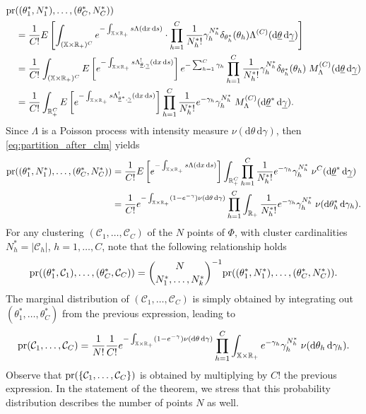 \documentclass[11pt,a4paper,oneside]{article}
\newcommand{\calC}{\mathcal{C}}
\newcommand{\dd}{\mathrm d}
\newcommand{\E}{E}
\newcommand{\X}{\mathbb{X}}
\newcommand{\R}{\mathbb{R}}
\newcommand{\prob}{{\rm pr}}
\theoremstyle{definition}
\theoremstyle{remark}
\begin{document}
\begin{align}
   & \prob((\theta^*_1,N^*_1),\ldots,(\theta^*_C,N^*_C)) \notag \\
    &\quad= \frac{1}{C!}\E\left[ \int_{(\X\times\R_+)^C}  e^{-\int_{\X\times\R_+} s \Lambda(\dd x\, \dd s)} \cdot \prod_{h=1}^C \frac{1}{{N^*_h}!}  \gamma_h^{N^*_h} \delta_{\theta^*_h}(\theta_h)   \Lambda^{(C)} (\dd\underline{\theta}\, \dd \underline{\gamma}) \right] \notag \\
    &\quad= \frac{1}{C!} \int_{(\X\times\R_+)^C} \E\left[ e^{-\int_{\X\times\R_+} s \Lambda^!_{\underline{\theta}, \underline{\gamma}}(\dd x \, \dd s)} \right] e^{-\sum_{h=1}^C \gamma_h} \prod_{h=1}^C \frac{1}{{N^*_h}!}  \gamma_h^{N^*_h} \delta_{\theta^*_h}(\theta_h) \;   M_\Lambda^{(C)} (\dd\underline{\theta}\, \dd \underline{\gamma}) \notag  \\
    &\quad= \frac{1}{C!} \int_{\R_+^C} \E\left[ e^{-\int_{\X\times\R_+} s \Lambda^!_{\underline{\theta}^*, \underline{\gamma}}(\dd x \, \dd s)} \right]  \prod_{h=1}^C \frac{1}{{N^*_h}!}  e^{-\gamma_h} \gamma_h^{N^*_h}   \; M_\Lambda^{(C)} (\dd\underline{\theta}^* \,\dd \underline{\gamma}). \label{eq:partition_after_clm}
\end{align}
Since $\Lambda$ is a Poisson process with intensity measure $\nu(\dd\theta\, \dd\gamma)$, then \eqref{eq:partition_after_clm} yields
\begin{equation*}
\begin{aligned}
    \prob((\theta^*_1,N^*_1),\ldots,(\theta^*_C,N^*_C))&= \frac{1}{C!}\E\left[ e^{-\int_{\X\times\R_+} s \Lambda(\dd x\, \dd s)} \right]  \int_{\R_+^C}  \prod_{h=1}^C \frac{1}{{N^*_h}!}  e^{-\gamma_h} \gamma_h^{N^*_h}   \; \nu^C (\dd\underline{\theta}^*\, \dd \underline{\gamma})\\
    &= \frac{1}{C!} e^{-\int_{\X\times\R_+} (1 - e^{-\gamma}) \nu(\dd\theta \, \dd\gamma)} \prod_{h=1}^C \int_{\R_+}   \frac{1}{{N^*_h}!}  e^{-\gamma_h} \gamma_h^{N^*_h}   \; \nu (\dd \theta_h^* \, \dd \gamma_h).
\end{aligned}
\end{equation*}
For any clustering $(\calC_1,\ldots, \calC_C)$ of the $N$ points of $\Phi$, with cluster cardinalities $N^*_h = |\calC_h|$, $h=1,\ldots,C$, note that the following relationship holds
\[
\prob((\theta^*_1,\calC_1),\ldots, (\theta^*_C,\calC_C)) = \binom{N}{N^*_1,\ldots,N^*_k}^{-1} \prob((\theta^*_1,N^*_1),\ldots,(\theta^*_C,N^*_C)).
\]
The marginal distribution of $(\calC_1,\ldots,\calC_C)$ is simply obtained by integrating out $(\theta^*_1,\ldots,\theta^*_C)$ from the previous expression, leading to
\begin{equation*}
    \prob(\calC_1,\ldots,\calC_C) =\frac{1}{N!} \frac{1}{C!} e^{-\int_{\X\times\R_+} (1 - e^{-\gamma}) \nu(\dd\theta \, \dd\gamma)} \prod_{h=1}^C \int_{\X\times\R_+}    e^{-\gamma_h} \gamma_h^{N^*_h}   \; \nu (\dd \theta_h \, \dd \gamma_h). 
\end{equation*}
Observe that $\prob(\{\calC_1,\ldots, \calC_C\})$ is obtained by multiplying by $C!$ the previous expression. In the statement of the theorem, we stress that this probability distribution describes the number of points $N$ as well.    
\end{document}
